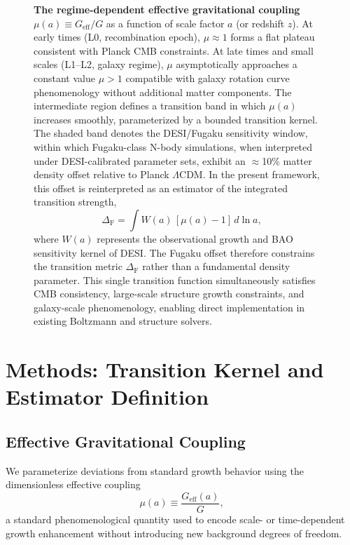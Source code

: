 \documentclass[12pt,a4paper]{article}
\newcommand{\Geff}{G_{\mathrm{eff}}}
\newcommand{\DeltaF}{\Delta_{\mathrm{F}}}
\begin{document}
\begin{figure}[h!]
\begin{tikzpicture}[scale=1.0]
\end{tikzpicture}
\caption{\textbf{The regime-dependent effective gravitational coupling} $\mu(a) \equiv \Geff/G$ as a function of scale factor $a$ (or redshift $z$). At early times (L0, recombination epoch), $\mu \approx 1$ forms a flat plateau consistent with Planck CMB constraints. At late times and small scales (L1--L2, galaxy regime), $\mu$ asymptotically approaches a constant value $\mu > 1$ compatible with galaxy rotation curve phenomenology without additional matter components. The intermediate region defines a transition band in which $\mu(a)$ increases smoothly, parameterized by a bounded transition kernel. The shaded band denotes the DESI/Fugaku sensitivity window, within which Fugaku-class N-body simulations, when interpreted under DESI-calibrated parameter sets, exhibit an $\approx$10\% matter density offset relative to Planck $\Lambda$CDM. In the present framework, this offset is reinterpreted as an estimator of the integrated transition strength,
\begin{equation*}
\DeltaF = \int W(a)\,[\mu(a)-1]\,d\ln a,
\end{equation*}
where $W(a)$ represents the observational growth and BAO sensitivity kernel of DESI. The Fugaku offset therefore constrains the transition metric $\DeltaF$ rather than a fundamental density parameter. This single transition function simultaneously satisfies CMB consistency, large-scale structure growth constraints, and galaxy-scale phenomenology, enabling direct implementation in existing Boltzmann and structure solvers.}
\label{fig:transition}
\end{figure}

\newpage

\section{Methods: Transition Kernel and Estimator Definition}

\subsection{Effective Gravitational Coupling}

We parameterize deviations from standard growth behavior using the dimensionless effective coupling
\begin{equation}
\mu(a) \equiv \frac{\Geff(a)}{G},
\label{eq:mu_def}
\end{equation}
a standard phenomenological quantity used to encode scale- or time-dependent growth enhancement without introducing new background degrees of freedom.
\end{document}
